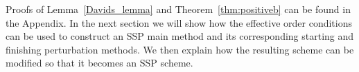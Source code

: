 %
%
%

Proofs of Lemma~\ref{Davids_lemma} and Theorem~\ref{thm:positiveb} can be found in the Appendix.
In the next section we will show how the effective order conditions can be used to construct an SSP main method and its corresponding starting and finishing perturbation methods.
We then explain how the resulting scheme can be modified so that it becomes an SSP scheme.
